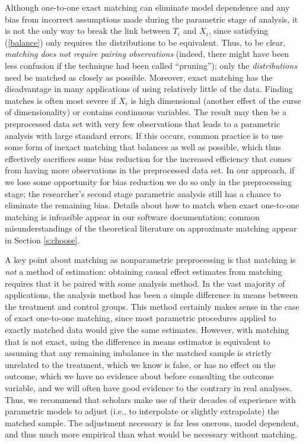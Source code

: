 \documentclass[11pt,titlepage]{article}
\begin{document}
Although one-to-one exact matching can eliminate model dependence and
any bias from incorrect assumptions made during the parametric stage
of analysis, it is not the only way to break the link between $T_i$
and $X_i$, since satisfying (\ref{balance}) only requires the
distributions to be equivalent.  Thus, to be clear, \emph{matching
  does not require pairing observations} (indeed, there might have
been less confusion if the technique had been called ``pruning'');
only the \emph{distributions} need be matched as closely as possible.
Moreover, exact matching has the disadvantage in many applications of
using relatively little of the data.  Finding matches is often most
severe if $X_i$ is high dimensional (another effect of the curse of
dimensionality) or contains continuous variables.  The result may then
be a preprocessed data set with very few observations that leads to a
parametric analysis with large standard errors.  If this
occurs, common practice is to use some form of inexact matching that
balances as well as possible, which thus effectively sacrifices some
bias reduction for the increased efficiency that comes from having
more observations in the preprocessed data set.  In our approach, if
we lose some opportunity for bias reduction we do so only in the
preprocessing stage; the researcher's second stage parametric analysis
still has a chance to eliminate the remaining bias.  Details about how
to match when exact one-to-one matching is infeasible appear in our
software documentation; common misunderstandings of the theoretical
literature on approximate matching appear in Section \ref{s:choose}.

A key point about matching as nonparametric preprocessing is that
matching is \emph{not} a method of estimation: obtaining causal effect
estimates from matching requires that it be paired with some analysis
method.  In the vast majority of applications, the analysis method has
been a simple difference in means between the treatment and control
groups.  This method certainly makes sense in the case of exact
one-to-one matching, since most parametric procedures applied to
exactly matched data would give the same estimates.  However, with
matching that is not exact, using the difference in means estimator is
equivalent to assuming that any remaining imbalance in the matched
sample is strictly unrelated to the treatment, which we know is false,
or has no effect on the outcome, which we have no evidence about
before consulting the outcome variable, and we will often have good
evidence to the contrary in real analyses.  Thus, we recommend that
scholars make use of their decades of experience with parametric
models to adjust (i.e., to interpolate or slightly extrapolate) the
matched sample.  The adjustment necessary is far less onerous, model
dependent, and thus much more empirical than what would be necessary
without matching.
\end{document}

